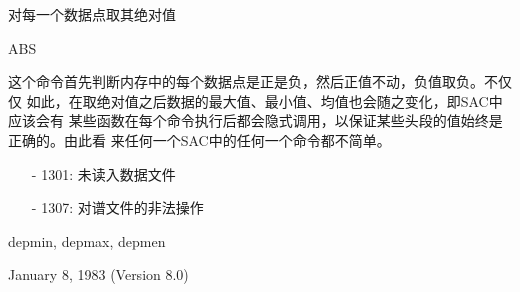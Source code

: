 \label{cmd:abs}

对每一个数据点取其绝对值

\begin{SACSTX}
ABS
\end{SACSTX}

这个命令首先判断内存中的每个数据点是正是负，然后正值不动，负值取负。不仅仅
如此，在取绝对值之后数据的最大值、最小值、均值也会随之变化，即SAC中应该会有
某些函数在每个命令执行后都会隐式调用，以保证某些头段的值始终是正确的。由此看
来任何一个SAC中的任何一个命令都不简单。

\begin{itemize}
\item[-]1301: 未读入数据文件
\item[-]1307: 对谱文件的非法操作
\end{itemize}

depmin, depmax, depmen

January 8, 1983 (Version 8.0)
